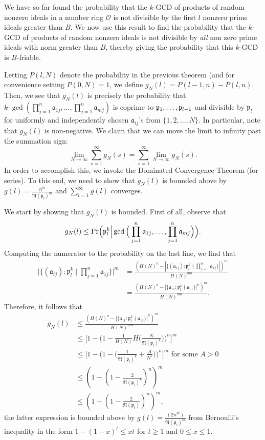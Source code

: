 \documentclass[12pt]{amsart}
\theoremstyle{definition}
\newcommand{\f}[1]{\mathfrak{#1}}
\begin{document}
We have so far found the probability that the $k$-GCD of products of random nonzero ideals in a number ring $\mathcal{O}$ is not divisible by the first \(l\) nonzero prime ideals greater than \(B\). We now use this result to find the probability that the $k$-GCD of products of random nonzero ideals is not divisible by \textit{all} non zero prime ideals with norm greater than $B$, thereby giving the probability that this $k$-GCD is $B$-friable.

Letting $P(l, N)$ denote the probability in the previous theorem (and for convenience setting $P(0, N) = 1$, we define $g_N(l) = P(l-1, n) - P(l, n)$. Then, we see that $g_N(l)$ is precisely the probability that $k\text{-}\gcd(\prod_{j=1}^n \f{a}_{1j}, ... , \prod_{j=1}^n \f{a}_{mj})$ is coprime to $\f{p}_1, \mathellipsis, \f{p}_{l-1}$ and divisible by $\f{p}_l$ for uniformly and independently chosen $\f{a}_{ij}$'s from $\{1, 2, ..., N\}$. In particular, note that $g_N(l)$ is non-negative. We claim that we can move the limit to infinity past the summation sign:
$$\lim_{N \to \infty} \sum_{s=1}^{\infty} g_N(s) = \sum_{s=1}^{\infty} \lim_{N \to \infty} g_N(s).$$
In order to accomplish this, we invoke the Dominated Convergence Theorem (for series). To this end, we need to show that $g_N(l)$ is bounded above by $g(l) = \frac{n^m}{\f{N}(\f{p}_{l})^{m}}$ and $\sum_{l=1}^{\infty} g(l)$ converges.

We start by showing that $g_N(l)$ is bounded. First of all, observe that
$$g_N(l) \leq \text{Pr}\Big(\f{p}_l^k \Big| \gcd\Big(\prod_{j=1}^n \f{a}_{1j}, \mathellipsis, \prod_{j=1}^n \f{a}_{mj}\Big)\Big).$$
Computing the numerator to the probability on the last line, we find that
\begin{align*} 
	\Big|\{(\f{a}_{ij}) : \f{p}_l^k \mid \prod_{j=1}^n \f{a}_{1j}\}\Big|^m &= \frac{(H(N)^n - |\{(\f{a}_{1j}) : \f{p}_l^k \nmid \prod_{j=1}^n \f{a}_{1j}\}|)^m}{H(N)^{mn}}\\
	&= \frac{(H(N)^n - |\{\f{a}_{11} : \f{p}_l^k \nmid \f{a}_{11}\}|^n)^m}{H(N)^{mn}}. \end{align*}
Therefore, it follows that
\begin{align*} 
	g_N(l) &\leq \frac{(H(N)^n - |\{\f{a}_{11} : \f{p}_l^k \nmid \f{a}_{11}\}|^n)^m}{H(N)^{mn}}\\
	&\leq \Big[1 - \Big(1 - \frac{1}{H(N)}  H\Big(\frac{N}{\f{N}(\f{p}_l)^k}\Big)\Big)^n\Big]^m\\
	&\leq \Big[1 - \Big(1 - \Big(\frac{1}{\f{N}(\f{p}_l)^k}+\frac{A}{N^{\varepsilon}}\Big)\Big)^n\Big]^m \text{ for some } A>0\\
	&\leq (1-(1-\frac{2}{\f{N}(\f{p}_l)^k})^n)^m\\
	&\leq (1-(1-\frac{2}{\f{N}(\f{p}_l)})^n)^m,
\end{align*}
the latter expression is bounded above by $g(l)=\frac{(2n^m)}{\f{N}(\f{p}_l)^m}$ from Bernoulli's inequality in the form $1-(1-x)^t\leq xt$ for $t\geq 1$ and $0\leq x \leq 1$.
\end{document}
